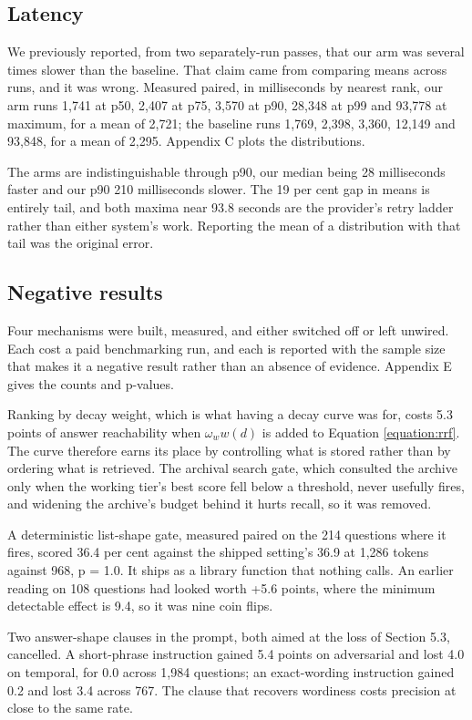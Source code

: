 \documentclass[10pt,a4paper,twocolumn]{article}
\begin{document}
\subsection{Latency}

We previously reported, from two separately-run passes, that our arm was several times slower than the baseline. That claim came from comparing means across runs, and it was wrong. Measured paired, in milliseconds by nearest rank, our arm runs 1,741 at p50, 2,407 at p75, 3,570 at p90, 28,348 at p99 and 93,778 at maximum, for a mean of 2,721; the baseline runs 1,769, 2,398, 3,360, 12,149 and 93,848, for a mean of 2,295. Appendix C plots the distributions.

The arms are indistinguishable through p90, our median being 28 milliseconds faster and our p90 210 milliseconds slower. The 19 per cent gap in means is entirely tail, and both maxima near 93.8 seconds are the provider's retry ladder rather than either system's work. Reporting the mean of a distribution with that tail was the original error.

\subsection{Negative results}

Four mechanisms were built, measured, and either switched off or left unwired. Each cost a paid benchmarking run, and each is reported with the sample size that makes it a negative result rather than an absence of evidence. Appendix E gives the counts and p-values.

Ranking by decay weight, which is what having a decay curve was for, costs 5.3 points of answer reachability when $\omega_w w(d)$ is added to Equation \ref{equation:rrf}. The curve therefore earns its place by controlling what is stored rather than by ordering what is retrieved. The archival search gate, which consulted the archive only when the working tier's best score fell below a threshold, never usefully fires, and widening the archive's budget behind it hurts recall, so it was removed.

A deterministic list-shape gate, measured paired on the 214 questions where it fires, scored 36.4 per cent against the shipped setting's 36.9 at 1,286 tokens against 968, p = 1.0. It ships as a library function that nothing calls. An earlier reading on 108 questions had looked worth +5.6 points, where the minimum detectable effect is 9.4, so it was nine coin flips.

Two answer-shape clauses in the prompt, both aimed at the loss of Section 5.3, cancelled. A short-phrase instruction gained 5.4 points on adversarial and lost 4.0 on temporal, for 0.0 across 1,984 questions; an exact-wording instruction gained 0.2 and lost 3.4 across 767. The clause that recovers wordiness costs precision at close to the same rate.
\end{document}
